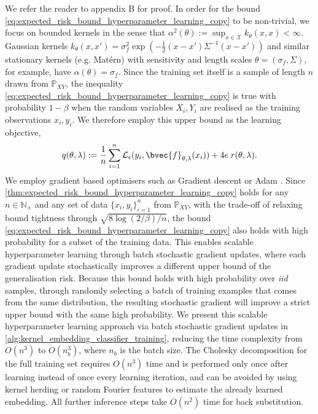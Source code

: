 \documentclass{article}
\begin{document}
	We refer the reader to appendix B for proof. In order for the bound \eqref{eq:expected_risk_bound_hyperparameter_learning_copy} to be non-trivial, we focus on bounded kernels in the sense that $\alpha^{2}(\theta) := \sup_{x \in \mathcal{X}} k_{\theta}(x, x) < \infty$. Gaussian kernels $k_{\theta}(x, x') = \sigma_{f}^{2} \exp{( - \frac{1}{2}(x - x') \Sigma^{-1} (x - x') )}$ and similar stationary kernels (e.g. Mat\'{e}rn) with sensitivity and length scales $\theta = (\sigma_{f}, \Sigma)$, for example, have $\alpha(\theta) = \sigma_{f}$. Since the training set itself is a sample of length $n$ drawn from $\mathbb{P}_{X Y}$, the inequality \eqref{eq:expected_risk_bound_hyperparameter_learning_copy} is true with probability $1 - \beta$ when the random variables $X_{i}, Y_{i}$ are realised as the training observations $x_{i}, y_{i}$. We therefore employ this upper bound as the learning objective,
	\begin{equation}
		q(\theta, \lambda) := \frac{1}{n} \sum_{i = 1}^{n} \mathcal{L}_{\epsilon}(y_{i}, \bvec{f}_{\theta, \lambda}(x_{i})) + 4 e \; r(\theta, \lambda).
	\label{eq:learning_objective}
	\end{equation}
	We employ gradient based optimisers such as Gradient descent or Adam \citep{kingma2014adam}. Since \cref{thm:expected_risk_bound_hyperparameter_learning_copy} holds for any $n \in \mathbb{N}_{+}$ and any set of data $\{x_{i}, y_{i}\}_{i = 1}^{n}$ from $\mathbb{P}_{X Y}$, with the trade-off of relaxing bound tightness through $\sqrt{8 \log{(2 / \beta)} / n}$, the bound \eqref{eq:expected_risk_bound_hyperparameter_learning_copy} also holds with high probability for a subset of the training data. This enables scalable hyperparameter learning through batch stochastic gradient updates, where each gradient update stochastically improves a different upper bound of the generalisation risk. Because this bound holds with high probability over \textit{iid} samples, through randomly selecting a batch of training examples that comes from the same distribution, the resulting stochastic gradient will improve a strict upper bound with the same high probability. We present this scalable hyperparameter learning approach via batch stochastic gradient updates in \cref{alg:kernel_embedding_classifier_training}, reducing the time complexity from $O(n^{3})$ to $O(n_{b}^{3})$, where $n_{b}$ is the batch size. The Cholesky decomposition for the full training set requires $O(n^{3})$ time and is performed only once after learning instead of once every learning iteration, and can be avoided by using kernel herding \citep{chen2010super} or random Fourier features \citep{rahimi2008random} to estimate the already learned embedding. All further inference steps take $O(n^{2})$ time for back substitution. 
	
\end{document}
